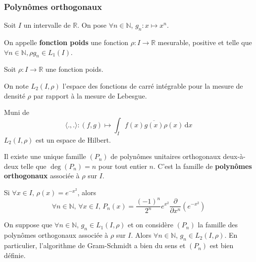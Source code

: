 	\subsubsection{Polynômes orthogonaux}


	Soit $I$ un intervalle de $\mathbb{R}$. On pose $\forall n \in \mathbb{N}$, $g_n : x \mapsto x^n$.

	\begin{definition}
		On appelle \textbf{fonction poids} une fonction $\rho : I \rightarrow \mathbb{R}$ mesurable, positive et telle que $\forall n \in \mathbb{N}, \rho g_n \in L_1(I)$.
	\end{definition}

	Soit $\rho : I \rightarrow \mathbb{R}$ une fonction poids.

	\begin{notation}
		On note $L_2(I, \rho)$ l'espace des fonctions de carré intégrable pour la mesure de densité $\rho$ par rapport à la mesure de Lebesgue.
	\end{notation}

	\begin{proposition}
		Muni de
		\[ \langle ., . \rangle : (f,g) \mapsto \int_I f(x) \overline{g(x)} \rho(x) \, \mathrm{d}x \]
		$L_2(I, \rho)$ est un espace de Hilbert.
	\end{proposition}

	\begin{theorem}
		Il existe une unique famille $(P_n)$ de polynômes unitaires orthogonaux deux-à-deux telle que $\deg(P_n) = n$ pour tout entier $n$. C'est la famille de \textbf{polynômes orthogonaux} associée à $\rho$ sur $I$.
	\end{theorem}

	\begin{example}
		Si $\forall x \in I, \, \rho(x) = e^{-x^2}$, alors
		\[ \forall n \in \mathbb{N}, \, \forall x \in I, \, P_n(x) = \frac{(-1)^n}{2^n} e^{x^2} \frac{\partial}{\partial x^n} \left( e^{-x^2} \right) \]
	\end{example}


	\begin{lemma}
		On suppose que $\forall n \in \mathbb{N}$, $g_n \in L_1(I, \rho)$ et on considère $(P_n)$ la famille des polynômes orthogonaux associée à $\rho$ sur $I$. Alors $\forall n \in \mathbb{N}$, $g_n \in L_2(I, \rho)$. En particulier, l'algorithme de Gram-Schmidt a bien du sens et $(P_n)$ est bien définie.
	\end{lemma}

